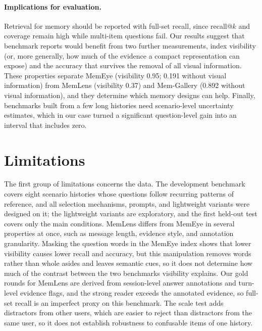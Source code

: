 \paragraph{Implications for evaluation.} Retrieval for memory should be reported with full-set recall, since recall@$k$ and coverage remain high while multi-item questions fail. Our results suggest that benchmark reports would benefit from two further measurements, index visibility (or, more generally, how much of the evidence a compact representation can expose) and the accuracy that survives the removal of all visual information. These properties separate MemEye (visibility 0.95; 0.191 without visual information) from MemLens (visibility 0.37) and Mem-Gallery (0.892 without visual information), and they determine which memory designs can help. Finally, benchmarks built from a few long histories need scenario-level uncertainty estimates, which in our case turned a significant question-level gain into an interval that includes zero.

\section{Limitations}
\label{sec:limitations}

The first group of limitations concerns the data. The development benchmark covers eight scenario histories whose questions follow recurring patterns of reference, and all selection mechanisms, prompts, and lightweight variants were designed on it; the lightweight variants are exploratory, and the first held-out test covers only the main conditions. MemLens differs from MemEye in several properties at once, such as message length, evidence style, and annotation granularity. Masking the question words in the MemEye index shows that lower visibility causes lower recall and accuracy, but this manipulation removes words rather than whole asides and leaves semantic cues, so it does not determine how much of the contrast between the two benchmarks visibility explains. Our gold rounds for MemLens are derived from session-level answer annotations and turn-level evidence flags, and the strong reader exceeds the annotated evidence, so full-set recall is an imperfect proxy on this benchmark. The scale test adds distractors from other users, which are easier to reject than distractors from the same user, so it does not establish robustness to confusable items of one history.

